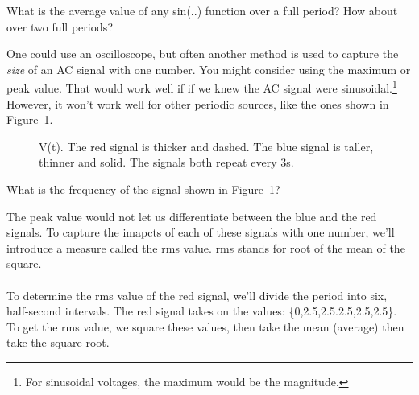 \begin{alevel}
What is the average value of any sin(..) function over a full period? How about over two full periods?
\end{alevel}

One could use an oscilloscope, but often another method is used to capture the \emph{size} of an AC signal with one number.  You might consider using the maximum or peak value. That would work well if if we knew the AC signal were sinusoidal.\footnote{For sinusoidal voltages, the maximum would be the magnitude.} However, it won't work well for other periodic sources, like the ones shown in Figure~\ref{F:8RMS}.

\par
\begin{figure}[H]
\begin{center}
\caption{V(t). The red signal is thicker and dashed. The blue signal is taller, thinner and solid. The signals both repeat every 3s.}
\label{F:8RMS}
\end{center}
\end{figure}

\begin{blevel}
What is the frequency of the signal shown in Figure~\ref{F:8RMS}?
\end{blevel}

The peak value would not let us differentiate between the blue and the red signals. To capture the imapcts of each of these signals with one number, we'll introduce a measure called the rms value. rms stands for root of the mean of the square.\\
\\
To determine the rms value of the red signal, we'll divide the period into six, half-second intervals. The red signal takes on the values: \{0,2.5,2.5.2.5,2.5,2.5\}. To get the rms value, we square these values, then take the mean (average) then take the square root. \\

